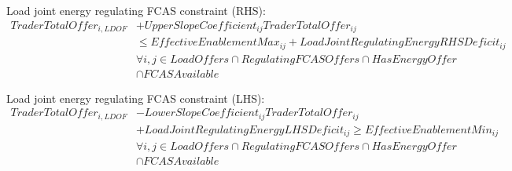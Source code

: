 \documentclass{article}
\begin{document}
%
%
%
%

Load joint energy regulating FCAS constraint (RHS):
\begin{equation}
\begin{split}
TraderTotalOffer_{i,LDOF} & + UpperSlopeCoefficient_{ij} TraderTotalOffer_{ij} \\
& \leq EffectiveEnablementMax_{ij} + LoadJointRegulatingEnergyRHSDeficit_{ij} \\
& \forall i,j \in LoadOffers \cap RegulatingFCASOffers \cap HasEnergyOffer \\
& \cap FCASAvailable
\end{split}
\end{equation}

%
%
%
%

Load joint energy regulating FCAS constraint (LHS):
\begin{equation}
\begin{split}
TraderTotalOffer_{i,LDOF} & - LowerSlopeCoefficient_{ij} TraderTotalOffer_{ij} \\
& + LoadJointRegulatingEnergyLHSDeficit_{ij} \geq EffectiveEnablementMin_{ij} \\
& \forall i,j \in LoadOffers \cap RegulatingFCASOffers \cap HasEnergyOffer \\
& \cap FCASAvailable
\end{split}
\end{equation}
\end{document}
